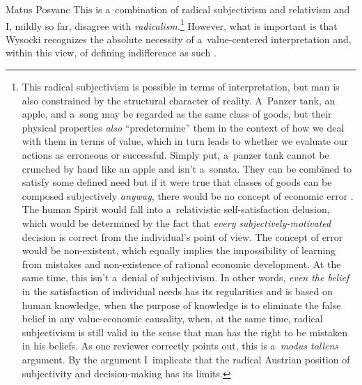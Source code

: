 \begin{artengenv}{Matus Posvanc}
This is a~combination of radical subjectivism and relativism and I, mildly so far, disagree with \textit{radicalism.}\footnote{This radical subjectivism is possible in terms of interpretation, but man is also constrained by the structural character of reality. A~Panzer tank, an apple, and a~song may be regarded as the same class of goods, but their physical properties \textit{also} ``predetermine'' them in the context of how we deal with them in terms of value, which in turn leads to whether we evaluate our actions as erroneous or successful. Simply put, a~panzer tank cannot be crunched by hand like an apple and isn't a~sonata. They can be combined to satisfy some defined need but if it were true that classes of goods can be composed subjectively \textit{anyway}, there would be no concept of economic error 
\parencite[see][]{Posvanc2021Evolutionary}. %
 The human Spirit would fall into a~relativistic self-satisfaction delusion, which would be determined by the fact that \textit{every} \textit{subjectively-motivated} decision is correct from the individual's point of view. The concept of error would be non-existent, which equally implies the impossibility of learning from mistakes and non-existence of rational economic development. At the same time, this isn't a~denial of subjectivism. In other words, \textit{even the belief} in the satisfaction of individual needs has its regularities and is based on human knowledge, when the purpose of knowledge is to eliminate the false belief in any value-economic causality, when, at the same time, radical subjectivism is still valid in the sense that man has the right to be mistaken in his beliefs. As one reviewer correctly points out, this is a~\textit{modus tollens} argument. By the argument I~implicate that the radical Austrian position of subjectivity and decision-making has its limits. } However, what is important is that Wysocki recognizes the absolute necessity of a~value-centered interpretation and, within this view, of defining indifference as such 
\parencite[see also][]{Machaj2007praxeological}.%





\end{artengenv}
